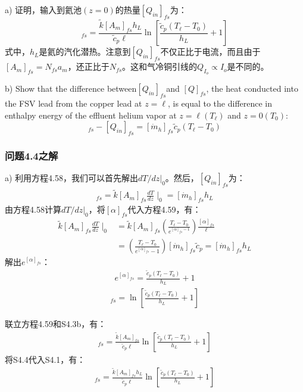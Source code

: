 a) 证明，输入到氦池$(z=0)$的热量$[Q_{in}]_{fs}$为：
\begin{equation}%
[Q_{in}]_{fs}=\frac{\tilde{k}[A_m]_{fs}h_L}{\tilde{c}_p\ell}\ln\left[\frac{\tilde{c}_p(T_\ell-T_0)}{h_L}+1\right]
\end{equation}
式中，$h_L$是氦的汽化潜热。注意到$[Q_{in}]_{fs}$不仅正比于电流，而且由于$[A_m]_{fs}= N_{fs} a_m$，还正比于$N_{fs}$。这和气冷铜引线的$Q_{I_o}\propto I_o$是不同的。

b) Show that the difference between$[Q_{in}]_{fs}$and $[Q]_{fs}$, the heat conducted into
the FSV lead from the copper lead at $z =\ell$, is equal to the difference in
enthalpy energy of the effluent helium vapor at $z=\ell(T_\ell)$ and $z=0 (T_0)$:
\begin{equation}%
[Q_\ell]_{fs}-[Q_{in}]_{fs}=[\dot{m}_h]_{fs}\tilde{c}_p(T_\ell-T_0)
\end{equation}

\subsubsection{问题4.4之解}
a) 利用方程4.58，我们可以首先解出$dT/dz|_0$。然后，$[Q_{in}]_{fs}$为：
\begin{align*}
[Q_{in}]_{fs}=\tilde{k}[A_m]_{fs}\frac{dT}{dz}\mid_0=[\dot{m}_h]_{fs}h_L \tag{S4.1}
\end{align*}
由方程4.58计算$dT/dz|_0$，将$[\alpha]_{fs}$代入方程4.59，有：
\begin{align*}
\tilde{k}[A_m]_{fs}\frac{dT}{dz}\mid_0&=\tilde{k}[A_m]_{fs}(\frac{T_\ell-T_0}{e^{[\alpha]_{fs}-1}})\frac{[\alpha]_{fs}}{\ell}\\
&=(\frac{T_\ell-T_0}{e^{[\alpha]_{fs}}-1})[\dot{m}_h]_{fs}\tilde{c}_p=[\dot{m}_h]_{fs}h_L\tag{S4.2}
\end{align*}
解出$e^{[\alpha]_{fs}}$：
\begin{align*}
e^{[\alpha]_{fs}}=\frac{\tilde{c}_p(T_\ell-T_0)}{h_L}+1 \tag{S4.3a}
\end{align*}
\begin{align*}
[\alpha]_{fs}=\ln\left[\frac{\tilde{c}_p(T_\ell-T_0)}{h_L}+1\right]\tag{S4.3b}
\end{align*}

联立方程4.59和S4.3b，有：
\begin{align*}
[\dot{m}_h]_{fs}=\frac{\tilde{k}[A_m]_{fs}}{\tilde{c}_p\ell}\ln\left[\frac{\tilde{c}_p(T_\ell-T_0)}{h_L}+1\right]\tag{S4.4}
\end{align*}
将S4.4代入S4.1，有：
\begin{align*}%
[Q_{in}]_{fs}=\frac{\tilde{k}[A_m]_{fs}h_L}{\tilde{c}_p\ell}\ln\left[\frac{\tilde{c}_p(T_\ell-T_0)}{h_L}+1\right] \tag{4.60}
\end{align*}

